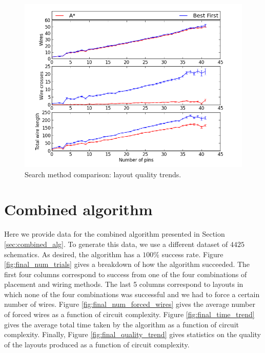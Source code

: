 \begin{figure}
\begin{center}
\includegraphics[width=\textwidth]{Images/search_quality_trend_comparison.png}
\caption{Search method comparison: layout quality trends.}
\label{fig:search_quality_trend}
\end{center}
\end{figure}

\section{Combined algorithm}

Here we provide data for the combined algorithm presented in Section
\ref{sec:combined_alg}. To generate this data, we use a different dataset of
$4425$ schematics. As desired, the algorithm has a $100\%$ success rate.
Figure \ref{fig:final_num_trials} gives a breakdown of how the algorithm
succeeded. The first four columns correspond to success from one of the four
combinations of placement and wiring methods. The last 5 columns correspond to
layouts in which none of the four combinations was successful and we had to
force a certain number of wires. Figure \ref{fig:final_num_forced_wires} gives
the average number of forced wires as a function of circuit complexity. Figure
\ref{fig:final_time_trend} gives the average total time taken by the algorithm
as a function of circuit complexity. Finally, Figure \ref{fig:final_quality_trend}
gives statistics on the quality of the layouts produced as a function of circuit
complexity.

